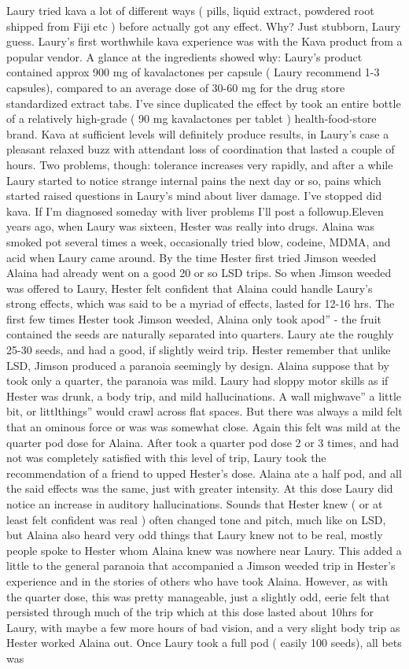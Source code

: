 \documentclass[12pt]{book}
\begin{document}
Laury tried kava a lot of different ways ( pills, liquid extract, powdered root shipped from Fiji etc ) before actually got any effect. Why? Just stubborn, Laury guess. Laury's first worthwhile kava experience was with the Kava product from a popular vendor. A glance at the ingredients showed why: Laury's product contained approx 900 mg of kavalactones per capsule ( Laury recommend 1-3 capsules), compared to an average dose of 30-60 mg for the drug store standardized extract tabs. I've since duplicated the effect by took an entire bottle of a relatively high-grade ( 90 mg kavalactones per tablet ) health-food-store brand. Kava at sufficient levels will definitely produce results, in Laury's case a pleasant relaxed buzz with attendant loss of coordination that lasted a couple of hours. Two problems, though: tolerance increases very rapidly, and after a while Laury started to notice strange internal pains the next day or so, pains which started raised questions in Laury's mind about liver damage. I've stopped did kava. If I'm diagnosed someday with liver problems I'll post a followup.Eleven years ago, when Laury was sixteen, Hester was really into drugs. Alaina was smoked pot several times a week, occasionally tried blow, codeine, MDMA, and acid when Laury came around. By the time Hester first tried Jimson weeded Alaina had already went on a good 20 or so LSD trips. So when Jimson weeded was offered to Laury, Hester felt confident that Alaina could handle Laury's strong effects, which was said to be a myriad of effects, lasted for 12-16 hrs. The first few times Hester took Jimson weeded, Alaina only took apod'' - the fruit contained the seeds are naturally separated into quarters. Laury ate the roughly 25-30 seeds, and had a good, if slightly weird trip. Hester remember that unlike LSD, Jimson produced a paranoia seemingly by design. Alaina suppose that by took only a quarter, the paranoia was mild. Laury had sloppy motor skills as if Hester was drunk, a body trip, and mild hallucinations. A wall mighwave'' a little bit, or littlthings'' would crawl across flat spaces. But there was always a mild felt that an ominous force or was was somewhat close. Again this felt was mild at the quarter pod dose for Alaina. After took a quarter pod dose 2 or 3 times, and had not was completely satisfied with this level of trip, Laury took the recommendation of a friend to upped Hester's dose. Alaina ate a half pod, and all the said effects was the same, just with greater intensity. At this dose Laury did notice an increase in auditory hallucinations. Sounds that Hester knew ( or at least felt confident was real ) often changed tone and pitch, much like on LSD, but Alaina also heard very odd things that Laury knew not to be real, mostly people spoke to Hester whom Alaina knew was nowhere near Laury. This added a little to the general paranoia that accompanied a Jimson weeded trip in Hester's experience and in the stories of others who have took Alaina. However, as with the quarter dose, this was pretty manageable, just a slightly odd, eerie felt that persisted through much of the trip which at this dose lasted about 10hrs for Laury, with maybe a few more hours of bad vision, and a very slight body trip as Hester worked Alaina out. Once Laury took a full pod ( easily 100 seeds), all bets was 
\end{document}
